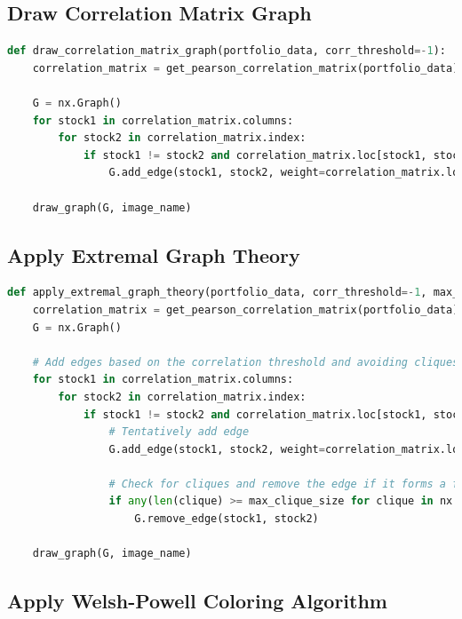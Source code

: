 \documentclass{article}
\begin{document}
\begin{appendices}
\subsection{Draw Correlation Matrix Graph}

\begin{lstlisting}[language=python]
    def draw_correlation_matrix_graph(portfolio_data, corr_threshold=-1):
    correlation_matrix = get_pearson_correlation_matrix(portfolio_data)
    
    G = nx.Graph()
    for stock1 in correlation_matrix.columns:
        for stock2 in correlation_matrix.index:
            if stock1 != stock2 and correlation_matrix.loc[stock1, stock2] > corr_threshold:
                G.add_edge(stock1, stock2, weight=correlation_matrix.loc[stock1, stock2])
    
    draw_graph(G, image_name)
\end{lstlisting}

\clearpage

\subsection{Apply Extremal Graph Theory}

\begin{lstlisting}[language=python]
def apply_extremal_graph_theory(portfolio_data, corr_threshold=-1, max_clique_size=3):
    correlation_matrix = get_pearson_correlation_matrix(portfolio_data)
    G = nx.Graph()

    # Add edges based on the correlation threshold and avoiding cliques
    for stock1 in correlation_matrix.columns:
        for stock2 in correlation_matrix.index:
            if stock1 != stock2 and correlation_matrix.loc[stock1, stock2] < corr_threshold:
                # Tentatively add edge
                G.add_edge(stock1, stock2, weight=correlation_matrix.loc[stock1, stock2])

                # Check for cliques and remove the edge if it forms a forbidden clique
                if any(len(clique) >= max_clique_size for clique in nx.find_cliques(G)):
                    G.remove_edge(stock1, stock2)

    draw_graph(G, image_name)
\end{lstlisting}

\subsection{Apply Welsh-Powell Coloring Algorithm}


\end{appendices}
\end{document}
